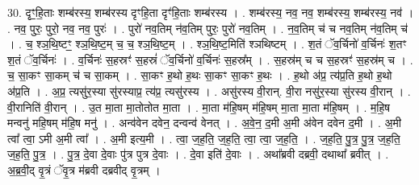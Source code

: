 \documentclass[17pt]{extarticle}
\begin{document}
30. दृꣳ॒॒हि॒ताः शम्ब॑रस्य॒ शम्ब॑रस्य दृꣳहि॒ता दृꣳ॑हि॒ताः शम्ब॑रस्य । . शम्ब॑रस्य॒ नव॒ नव॒ शम्ब॑रस्य॒ शम्ब॑रस्य॒ नव॑ । . नव॒ पुरः॒ पुरो॒ नव॒ नव॒ पुरः॑ । . पुरो॑ नव॒तिम् न॑व॒तिम् पुरः॒ पुरो॑ नव॒तिम् । . न॒व॒तिम् च॑ च नव॒तिम् न॑व॒तिम् च॑ । . च॒ श्ञ॒थि॒ष्टꣳ॒॒ श्ञ॒थि॒ष्ट॒म् च॒ च॒ श्ञ॒थि॒ष्ट॒म् । . श्ञ॒थि॒ष्ट॒मिति॑ श्ञथिष्टम् । . श॒तं ॅव॒र्चिनो॑ व॒र्चिनः॑ श॒तꣳ श॒तं ॅव॒र्चिनः॑ । . व॒र्चिनः॑ स॒हस्रꣳ॑ स॒हस्रं॑ ॅव॒र्चिनो॑ व॒र्चिनः॑ स॒हस्र᳚म् । . स॒हस्र॑म् च च स॒हस्रꣳ॑ स॒हस्र॑म् च । . च॒ सा॒कꣳ सा॒कम् च॑ च सा॒कम् । . सा॒कꣳ ह॒थो ह॒थः सा॒कꣳ सा॒कꣳ ह॒थः । . ह॒थो अ॑प्र॒ त्य॑प्र॒ति ह॒थो ह॒थो अ॑प्र॒ति । . अ॒प्र॒ त्यसु॑र॒स्या सु॑रस्याप्र॒ त्य॑प्र॒ त्यसु॑रस्य । . असु॑रस्य वी॒रान्. वी॒रा नसु॑र॒स्या सु॑रस्य वी॒रान् । . वी॒रानिति॑ वी॒रान् । . उ॒त मा॒ता मा॒तोतोत मा॒ता । . मा॒ता म॑हि॒षम् म॑हि॒षम् मा॒ता मा॒ता म॑हि॒षम् । . म॒हि॒ष मन्वनु॑ महि॒षम् म॑हि॒ष मनु॑ । . अन्व॑वेन दवेन॒ दन्वन्व॑ वेनत् । . अ॒वे॒न॒ द॒मी अ॒मी अ॑वेन दवेन द॒मी । . अ॒मी त्वा᳚ त्वा॒ ऽमी अ॒मी त्वा᳚ । . अ॒मी इत्य॒मी । . त्वा॒ ज॒ह॒ति॒ ज॒ह॒ति॒ त्वा॒ त्वा॒ ज॒ह॒ति॒ । . ज॒ह॒ति॒ पु॒त्र॒ पु॒त्र॒ ज॒ह॒ति॒ ज॒ह॒ति॒ पु॒त्र॒ । . पु॒त्र॒ दे॒वा दे॒वाः पु॑त्र पुत्र दे॒वाः । . दे॒वा इति॑ दे॒वाः । . अथा᳚ब्रवी दब्रवी॒ दथाथा᳚ ब्रवीत् । . अ॒ब्र॒वी॒द् वृ॒त्रं ॅवृ॒त्र म॑ब्रवी दब्रवीद् वृ॒त्रम् । \newline
\end{document}
